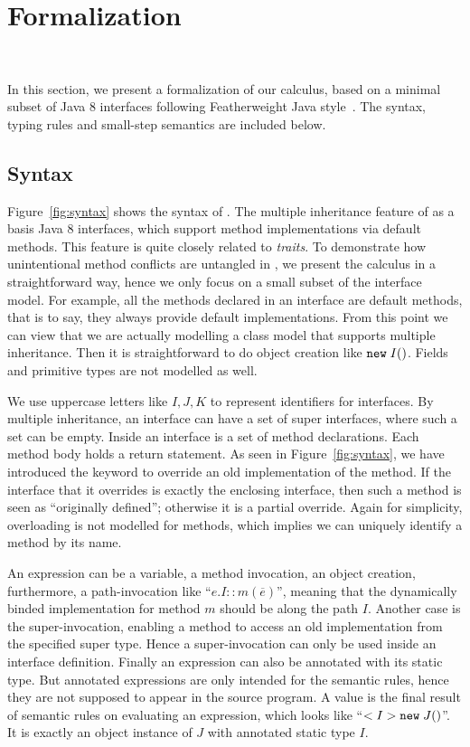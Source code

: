 \section{Formalization}~\label{sec:formalization}

In this section, we present a formalization of our \MIM{} calculus, based on
a minimal subset of Java 8 interfaces following Featherweight Java style~\cite{Igarashi01FJ}.
The syntax, typing rules and small-step
semantics are included below.

\subsection{Syntax}

Figure~\ref{fig:syntax} shows the syntax of \MIM{}. The multiple
inheritance feature of \MIM{} as a basis Java 8 interfaces, which support
method implementations via default methods. This feature is quite
closely related to \emph{traits}\cite{scharli03traits}.  To demonstrate how
unintentional method conflicts are untangled in \MIM{}, we present the
calculus in a straightforward way, hence we only focus on a small
subset of the interface model. For example, all the methods declared
in an interface are default methods, that is to say, they always
provide default implementations.  From this point we can view that we
are actually modelling a class model that supports multiple
inheritance. Then it is straightforward to do object creation like
$\texttt{new} \; I()$. Fields and primitive types are not modelled as well.

We use uppercase letters like $I, J, K$ to represent identifiers for
interfaces. By multiple inheritance, an interface can have a set of
super interfaces, where such a set can be empty. Inside an interface
is a set of method declarations. Each method body holds a return
statement. As seen in Figure~\ref{fig:syntax}, we have introduced the
\kwoverride{} keyword to override an old implementation of the
method. If the interface that it overrides is exactly the enclosing
interface, then such a method is seen as ``originally defined''; otherwise
it is a partial override.
Again for simplicity, overloading is not modelled for methods, which
implies we can uniquely identify a method by its name.

An expression can be a variable, a method invocation, an object
creation, furthermore, a path-invocation like
``$e.I::m(\overline{e})$'', meaning that the dynamically binded
implementation for method $m$ should be along the path $I$. Another
case is the super-invocation, enabling a method to access an old
implementation from the specified super type. Hence a super-invocation
can only be used inside an interface definition.
Finally an expression can also be annotated with its static type. But annotated expressions are only intended for the semantic rules,
hence they are not supposed to appear in the source program. A value is the final result of semantic
rules on evaluating an expression, which looks like ``$<I> \texttt{new} \; J()$''. It is exactly an object instance
of $J$ with annotated static type $I$.


